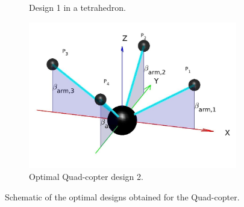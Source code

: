 \begin{figure}[!h]
{\begin{subfigure}[b]{0.35\textwidth}
    \caption{Design 1 in a tetrahedron.} \label{fig:Quadcopter_resultb}
  \end{subfigure}
  \hspace*{\fill} %
  \begin{subfigure}[b]{0.45\textwidth}
    \includegraphics[width=\linewidth]{images/Quadcopter2.jpg}
    \caption{Optimal Quad-copter design 2.} \label{fig:Quadcopter_resultc}
  \end{subfigure}}
  \caption{Schematic of the optimal designs obtained for the Quad-copter.}
  \label{fig:Quadcopter_result}
\end{figure}

